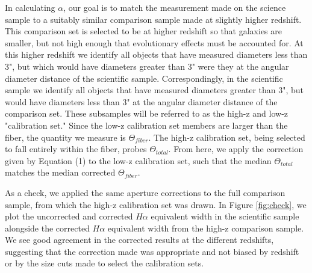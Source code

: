 \documentclass[iop]{emulateapj}
\begin{document}
In calculating $\alpha$, our goal is to match the measurement made on the science sample to a suitably similar comparison sample made at slightly higher redshift. This comparison set is selected to be at higher redshift so that galaxies are smaller, but not high enough that evolutionary effects must be accounted for. At this higher redshift we identify all objects that have measured diameters less than 3", but which would have diameters greater than 3" were they at the angular diameter distance of the scientific sample. Correspondingly, in the scientific sample we identify all objects that have measured diameters greater than 3", but would have diameters less than 3" at the angular diameter distance of the comparison set. These subsamples will be referred to as the high-z and low-z "calibration set." Since the low-z calibration set members are larger than the fiber, the quantity we measure is $\Theta_{fiber}$. The high-z calibration set, being selected to fall entirely within the fiber, probes $\Theta_{total}$. From here, we apply the correction given by Equation (1) to the low-z calibration set, such that the median $\Theta_{total}$ matches the median corrected $\Theta_{fiber}$. 

As a check, we applied the same aperture corrections to the full comparison sample, from which the high-z calibration set was drawn. In Figure \ref{fig:check}, we plot the uncorrected and corrected $H\alpha$ equivalent width in the scientific sample alongside the corrected $H\alpha$ equivalent width from the high-z comparison sample. We see good agreement in the corrected results at the different redshifts, suggesting that the correction made was appropriate and not biased by redshift or by the size cuts made to select the calibration sets.
\end{document}
